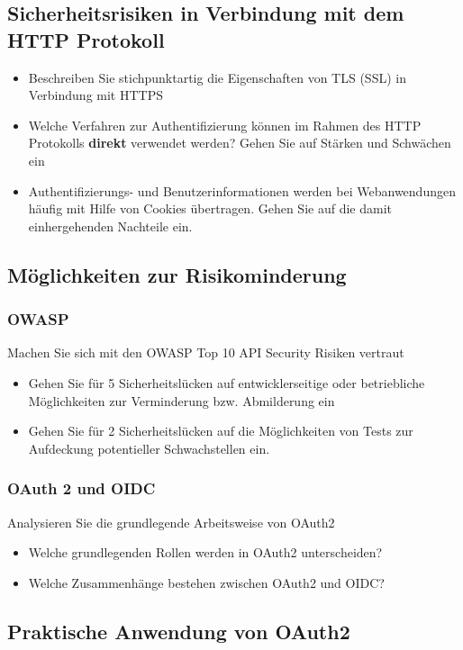 \documentclass[notitlepage, hidelinks]{article}
\begin{document}
\subsection{Sicherheitsrisiken in Verbindung mit dem HTTP Protokoll}
\begin{itemize}
\item Beschreiben Sie stichpunktartig die Eigenschaften von TLS (SSL) in Verbindung mit HTTPS
\item Welche Verfahren zur Authentifizierung können im Rahmen des HTTP Protokolls \textbf{direkt} verwendet werden? Gehen Sie auf Stärken und Schwächen ein
\item Authentifizierungs- und Benutzerinformationen werden bei Webanwendungen häufig mit Hilfe von Cookies übertragen. Gehen Sie auf die damit einhergehenden Nachteile ein. 
\end{itemize}

\subsection{Möglichkeiten zur Risikominderung}
\subsubsection{OWASP}
Machen Sie sich mit den OWASP Top 10 API Security Risiken vertraut
\begin{itemize}
\item Gehen Sie für 5 Sicherheitslücken auf entwicklerseitige oder betriebliche Möglichkeiten zur Verminderung bzw. Abmilderung ein
\item Gehen Sie für 2 Sicherheitslücken auf die Möglichkeiten von Tests zur Aufdeckung potentieller Schwachstellen ein.
\end{itemize}

\subsubsection{OAuth 2 und OIDC}
Analysieren Sie die grundlegende Arbeitsweise von OAuth2
\begin{itemize}
\item Welche grundlegenden Rollen werden in OAuth2 unterscheiden?
\item Welche Zusammenhänge bestehen zwischen OAuth2 und OIDC?
\end{itemize}

\subsection{Praktische Anwendung von OAuth2}
\end{document}

